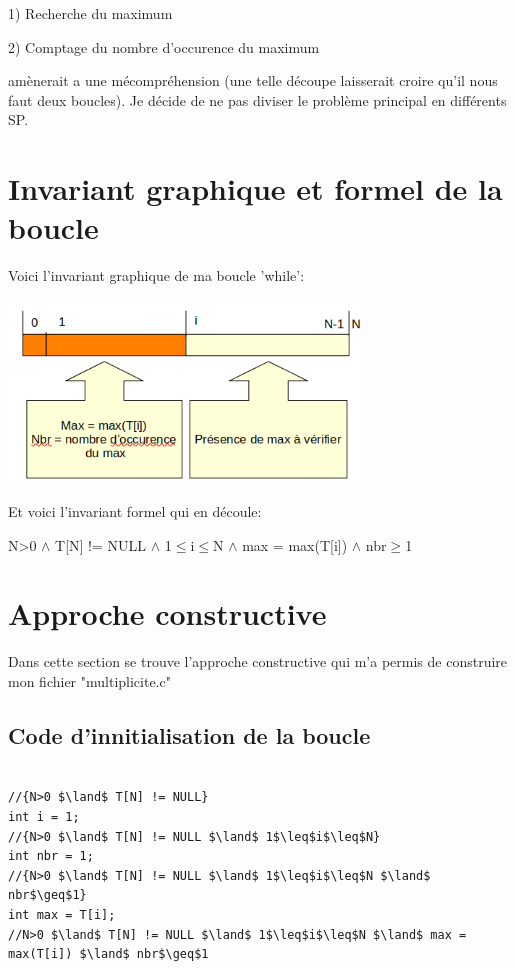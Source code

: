 \documentclass[a4paper, 11pt, oneside]{article}
\begin{document}
1) Recherche du maximum

2) Comptage du nombre d'occurence du maximum

amènerait a une mécompréhension (une telle découpe laisserait croire qu'il nous faut deux boucles).
Je décide de ne pas diviser le problème principal en différents SP.




\section{Invariant graphique et formel de la boucle}

\begin{center}

Voici l'invariant graphique de ma boucle 'while':

\includegraphics[width=0.70\textwidth]{gliprojet1.png}

\end{center}

Et voici l'invariant formel qui en découle:

\begin{center}

N>0 $\land$ T[N] != NULL $\land$ 1$\leq$i$\leq$N $\land$ max = max(T[i]) $\land$ nbr$\geq$1

\end{center}

\section{Approche constructive}

Dans cette section se trouve l'approche constructive qui m'a permis de construire mon fichier "multiplicite.c" 
\subsection{Code d'innitialisation de la boucle}

\begin{lstlisting}[caption={Code d'innitialisation de la boucle}]

//{N>0 $\land$ T[N] != NULL}
int i = 1;
//{N>0 $\land$ T[N] != NULL $\land$ 1$\leq$i$\leq$N}
int nbr = 1;
//{N>0 $\land$ T[N] != NULL $\land$ 1$\leq$i$\leq$N $\land$ nbr$\geq$1}
int max = T[i];
//N>0 $\land$ T[N] != NULL $\land$ 1$\leq$i$\leq$N $\land$ max = max(T[i]) $\land$ nbr$\geq$1

\end{lstlisting}
\end{document}
